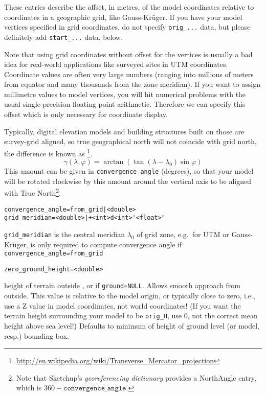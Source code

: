\noindent These entries describe the offset, in metres, of the model coordinates relative
to coordinates in a geographic grid, like Gauss-Kr\"uger. If you have your model
vertices specified in grid coordinates, do not specify \verb|orig_...| data, but
please definitely add \verb|start_...| data, below.

Note that using grid coordinates without offset for the vertices is
usually a bad idea for real-world applications like surveyed sites in
UTM coordinates. Coordinate values are often very large numbers
(ranging into millions of meters from equator and many thousands from
the zone meridian). If you want to assign millimetre values to model
vertices, you will hit numerical problems with the usual
single-precision floating point arithmetic. Therefore we can specify
this offset which is only necessary for coordinate display.

Typically, digital elevation models and building structures built on those are
survey-grid aligned, so true geographical north will not coincide with grid
north, the difference is known as \footnote{%
  \url{http://en.wikipedia.org/wiki/Transverse_Mercator_projection}}.
\begin{equation}
\gamma(\lambda, \varphi)=\arctan(\tan(\lambda-\lambda_0)\sin\varphi)
\end{equation}
This amount can be given in \verb|convergence_angle| (degrees), so
that your model will be rotated clockwise by this amount around the
vertical axis to be aligned with True North\footnote{Note that
  Sketchup's \emph{georeferencing dictionary} provides a NorthAngle
  entry, which is $360-\mathtt{convergence\_angle}$.}.

\begin{verbatim}
convergence_angle=from_grid|<double> 
grid_meridian=<double>|+<int>d<int>'<float>"      
\end{verbatim}


\noindent \texttt{grid\_meridian} is the central meridian $\lambda_0$ of grid
zone, e.g.\ for UTM or Gauss-Kr\"uger, is only required to compute
convergence angle if \texttt{convergence\_angle=from\_grid}



\begin{verbatim}
zero_ground_height=<double> 
\end{verbatim}
height of terrain outside , or if \verb|ground=NULL|.
Allows smooth approach from outside.  This value is relative to the model
origin, or typically close to zero, i.e.,  use a Z value in model coordinates,
not world coordinates! (If you want the terrain height surrounding your model to
be \texttt{orig\_H}, use 0, not the correct mean height above sea level!)  Defaults
to minimum of height of ground level (or model, resp.) bounding box.

